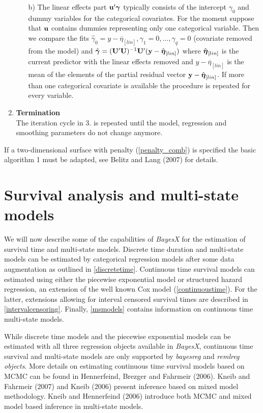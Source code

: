 \documentclass[11pt,a4paper,twoside]{bayesxarticle}
\begin{document}
\begin{enumerate}
\begin{itemize}
\item[b)] The linear effects part $\mathbf{u}'\boldsymbol{\gamma}$  typically consists of the intercept $\gamma_0$ and
dummy variables for the categorical covariates. For the moment suppose that $\mathbf{u}$ contains
dummies representing only one categorical variable. Then we compare the fits
$\hat{\gamma}_0 = \overline{y-\eta_{[lin]}}, \gamma_1=0,\dots,\gamma_q=0$ (covariate removed from the model) and
$\hat{\boldsymbol{\gamma}} = (\mathbf{U}'\mathbf{U})^{-1} \mathbf{U}' (\mathbf{y} - \hat{\boldsymbol{\eta}}_{[lin]})$ where
$\hat{\boldsymbol{\eta}}_{[lin]}$ is the current predictor with the linear effects removed and
$\overline{y-\eta_{[lin]}}$ is the mean of the elements of the partial residual vector
$\mathbf{y} - \hat{\boldsymbol{\eta}}_{[lin]}$. If more than one categorical covariate is available
the procedure is repeated for every variable.
\end{itemize}
\item {\bf Termination} \\
The iteration cycle in 3. is repeated until the model, regression and smoothing parameters do not change anymore.
\end{enumerate}
If a two-dimensional surface with penalty (\ref{penalty_comb}) is
specified the basic algorithm 1 must be adapted, see Belitz and Lang
(2007) for details.


\section{Survival analysis and multi-state models}
\label{survivalAnalysis}

We will now describe some of the capabilities of {\em BayesX} for
the estimation of survival time and multi-state models. Discrete
time duration and multi-state models can be estimated by categorical
regression models after some data augmentation as outlined in
\autoref{discretetime}. Continuous time survival models can
estimated using either the piecewise exponential model or structured
hazard regression, an extension of the well known Cox model
(\autoref{continuoustime}). For the latter, extensions allowing for
interval censored survival times are described in
\autoref{intervalcensoring}. Finally, \autoref{msmodels} contains
information on continuous time multi-state models.

While discrete time models and the piecewise exponential models can
be estimated with all three regression objects available in {\em
BayesX}, continuous time survival and multi-state models are only
supported by {\em bayesreg} and {\em remlreg objects}. More details
on estimating continuous time survival models based on MCMC can be
found in Hennerfeind, Brezger and Fahrmeir (2006). Kneib and
Fahrmeir (2007) and Kneib (2006) present inference based on mixed
model methodology. Kneib and Hennerfeind (2006) introduce both MCMC
and mixed model based inference in multi-state models.
\end{document}
